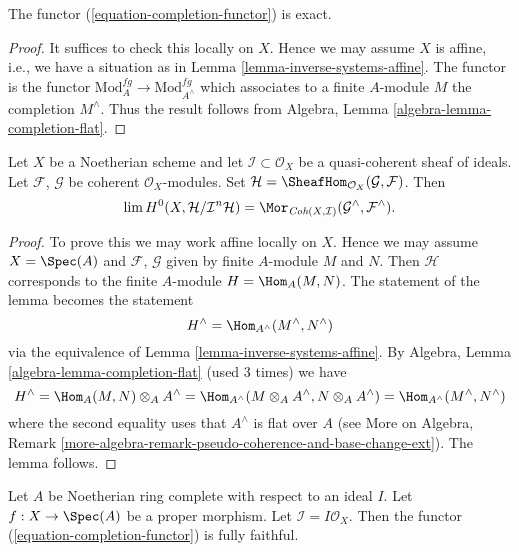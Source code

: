 \begin{lemma}
\label{lemma-exact}
The functor (\ref{equation-completion-functor}) is exact.
\end{lemma}

\begin{proof}
It suffices to check this locally on $X$. Hence we may assume $X$ is
affine, i.e., we have a situation as in
Lemma \ref{lemma-inverse-systems-affine}.
The functor is the functor $\text{Mod}^{fg}_A \to \text{Mod}^{fg}_{A^\wedge}$
which associates to a finite $A$-module $M$ the completion $M^\wedge$.
Thus the result follows from
Algebra, Lemma \ref{algebra-lemma-completion-flat}.
\end{proof}

\begin{lemma}
\label{lemma-completion-internal-hom}
Let $X$ be a Noetherian scheme and let $\mathcal{I} \subset \mathcal{O}_X$
be a quasi-coherent sheaf of ideals. Let $\mathcal{F}$, $\mathcal{G}$ be
coherent $\mathcal{O}_X$-modules. Set
$\mathcal{H} = \SheafHom_{\mathcal{O}_X}(\mathcal{G}, \mathcal{F})$.
Then
$$
\lim H^0(X, \mathcal{H}/\mathcal{I}^n\mathcal{H}) =
\Mor_{\textit{Coh}(X, \mathcal{I})}
(\mathcal{G}^\wedge, \mathcal{F}^\wedge).
$$
\end{lemma}

\begin{proof}
To prove this we may work affine locally on $X$.
Hence we may assume $X = \Spec(A)$ and $\mathcal{F}$, $\mathcal{G}$
given by finite $A$-module $M$ and $N$. Then $\mathcal{H}$
corresponds to the finite $A$-module $H = \Hom_A(M, N)$.
The statement of the lemma becomes the statement
$$
H^\wedge = \Hom_{A^\wedge}(M^\wedge, N^\wedge)
$$
via the equivalence of Lemma \ref{lemma-inverse-systems-affine}.
By Algebra, Lemma \ref{algebra-lemma-completion-flat}
(used 3 times) we have
$$
H^\wedge = \Hom_A(M, N) \otimes_A A^\wedge =
\Hom_{A^\wedge}(M \otimes_A A^\wedge, N \otimes_A A^\wedge) =
\Hom_{A^\wedge}(M^\wedge, N^\wedge)
$$
where the second equality uses that $A^\wedge$ is flat over $A$
(see More on Algebra, Remark
\ref{more-algebra-remark-pseudo-coherence-and-base-change-ext}).
The lemma follows.
\end{proof}

\begin{lemma}
\label{lemma-fully-faithful}
Let $A$ be Noetherian ring complete with respect to an ideal $I$.
Let $f : X \to \Spec(A)$ be a proper morphism. Let
$\mathcal{I} = I\mathcal{O}_X$.
Then the functor (\ref{equation-completion-functor}) is fully faithful.
\end{lemma}

